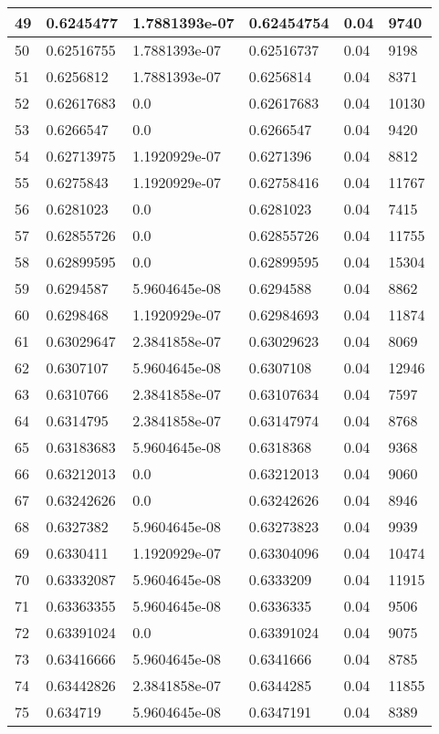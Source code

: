 \begin{longtable}{|l|l|l|l|l|l|}
49 & 0.6245477 & 1.7881393e-07 & 0.62454754 & 0.04 & 9740 \\ \hline 
50 & 0.62516755 & 1.7881393e-07 & 0.62516737 & 0.04 & 9198 \\ \hline 
51 & 0.6256812 & 1.7881393e-07 & 0.6256814 & 0.04 & 8371 \\ \hline 
52 & 0.62617683 & 0.0 & 0.62617683 & 0.04 & 10130 \\ \hline 
53 & 0.6266547 & 0.0 & 0.6266547 & 0.04 & 9420 \\ \hline 
54 & 0.62713975 & 1.1920929e-07 & 0.6271396 & 0.04 & 8812 \\ \hline 
55 & 0.6275843 & 1.1920929e-07 & 0.62758416 & 0.04 & 11767 \\ \hline 
56 & 0.6281023 & 0.0 & 0.6281023 & 0.04 & 7415 \\ \hline 
57 & 0.62855726 & 0.0 & 0.62855726 & 0.04 & 11755 \\ \hline 
58 & 0.62899595 & 0.0 & 0.62899595 & 0.04 & 15304 \\ \hline 
59 & 0.6294587 & 5.9604645e-08 & 0.6294588 & 0.04 & 8862 \\ \hline 
60 & 0.6298468 & 1.1920929e-07 & 0.62984693 & 0.04 & 11874 \\ \hline 
61 & 0.63029647 & 2.3841858e-07 & 0.63029623 & 0.04 & 8069 \\ \hline 
62 & 0.6307107 & 5.9604645e-08 & 0.6307108 & 0.04 & 12946 \\ \hline 
63 & 0.6310766 & 2.3841858e-07 & 0.63107634 & 0.04 & 7597 \\ \hline 
64 & 0.6314795 & 2.3841858e-07 & 0.63147974 & 0.04 & 8768 \\ \hline 
65 & 0.63183683 & 5.9604645e-08 & 0.6318368 & 0.04 & 9368 \\ \hline 
66 & 0.63212013 & 0.0 & 0.63212013 & 0.04 & 9060 \\ \hline 
67 & 0.63242626 & 0.0 & 0.63242626 & 0.04 & 8946 \\ \hline 
68 & 0.6327382 & 5.9604645e-08 & 0.63273823 & 0.04 & 9939 \\ \hline 
69 & 0.6330411 & 1.1920929e-07 & 0.63304096 & 0.04 & 10474 \\ \hline 
70 & 0.63332087 & 5.9604645e-08 & 0.6333209 & 0.04 & 11915 \\ \hline 
71 & 0.63363355 & 5.9604645e-08 & 0.6336335 & 0.04 & 9506 \\ \hline 
72 & 0.63391024 & 0.0 & 0.63391024 & 0.04 & 9075 \\ \hline 
73 & 0.63416666 & 5.9604645e-08 & 0.6341666 & 0.04 & 8785 \\ \hline 
74 & 0.63442826 & 2.3841858e-07 & 0.6344285 & 0.04 & 11855 \\ \hline 
75 & 0.634719 & 5.9604645e-08 & 0.6347191 & 0.04 & 8389 \\ \hline 
\end{longtable}